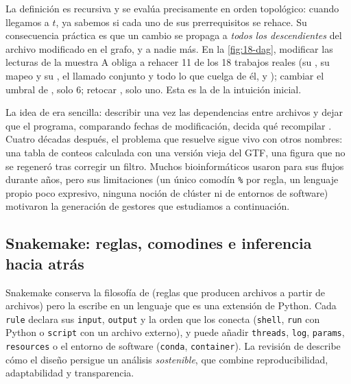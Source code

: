 La definición es recursiva y se evalúa precisamente en orden topológico: cuando llegamos a $t$, ya sabemos si cada uno de sus prerrequisitos se rehace. Su consecuencia práctica es que un cambio se propaga a \emph{todos los descendientes} del archivo modificado en el grafo, y a nadie más. En la \cref{fig:18-dag}, modificar las lecturas de la muestra A obliga a rehacer 11 de los 18 trabajos reales (su , su mapeo y su , el llamado conjunto y todo lo que cuelga de él, y ); cambiar el umbral de , solo 6; retocar , solo uno. Esta es la  de la intuición inicial.

\begin{historia}
La idea de  era sencilla: describir una vez las dependencias entre archivos y dejar que el programa, comparando fechas de modificación, decida qué recompilar \parencite{c18-feldman1979}. Cuatro décadas después, el problema que resuelve sigue vivo con otros nombres: una tabla de conteos calculada con una versión vieja del GTF, una figura que no se regeneró tras corregir un filtro. Muchos bioinformáticos usaron  para sus flujos durante años, pero sus limitaciones (un único comodín \texttt{\%} por regla, un lenguaje propio poco expresivo, ninguna noción de clúster ni de entornos de software) motivaron la generación de gestores que estudiamos a continuación.
\end{historia}

\subsection{Snakemake: reglas, comodines e inferencia hacia atrás}\label{sec:18-snakemake}

Snakemake \parencite{c18-koster2012} conserva la filosofía de  (reglas que producen archivos a partir de archivos) pero la escribe en un lenguaje que es una extensión de Python. Cada \texttt{rule} declara sus \texttt{input}, \texttt{output} y la orden que los conecta (\texttt{shell}, \texttt{run} con Python o \texttt{script} con un archivo externo), y puede añadir \texttt{threads}, \texttt{log}, \texttt{params}, \texttt{resources} o el entorno de software (\texttt{conda}, \texttt{container}). La revisión de \textcite{c18-molder2021} describe cómo el diseño persigue un análisis \emph{sostenible}, que combine reproducibilidad, adaptabilidad y transparencia.

